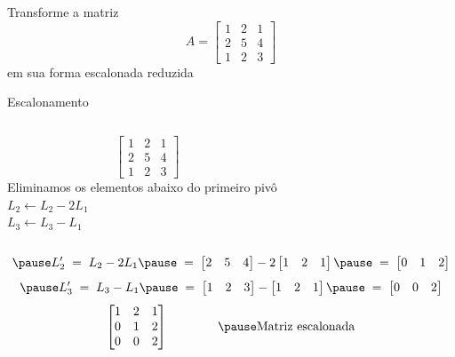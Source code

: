\begin{question}
Transforme a matriz
\[
  A =
  \begin{bmatrix}
    1 & 2 & 1 \\
    2 & 5 & 4 \\
    1 & 2 & 3
  \end{bmatrix}
\]
em sua forma escalonada reduzida
\end{question}

\begin{resolution}{Escalonamento}
\begin{columns}
  \[\;\;\;
  \begin{bmatrix}
    1 & 2 & 1 \\
    2 & 5 & 4 \\
    1 & 2 & 3
  \end{bmatrix}
  \]
  \pause
{}
  Eliminamos os elementos abaixo do primeiro pivô
  \\ \pause
  \(
    L_2 \leftarrow L_2 - 2 L_1
  \)
  \\ \pause
  \(
    L_3 \leftarrow L_3 - L_1
  \)
\end{columns}
\vspace{-\baselineskip}
\[
  \pause
  L'_2
  \;=\;
  L_2 - 2 L_1
  \pause
  \;=\;
  \begin{bmatrix}
    2 & 5 & 4
  \end{bmatrix}
  - 2
  \begin{bmatrix}
    1 & 2 & 1
  \end{bmatrix}
  \pause
  \;=\;
  \begin{bmatrix}
    0 & 1 & 2
  \end{bmatrix}
\]
\[
  \pause
  L'_3
  \;=\;
  L_3 - L_1
  \pause
  \;=\;
  \begin{bmatrix}
    1 & 2 & 3
  \end{bmatrix}
  -
  \begin{bmatrix}
    1 & 2 & 1
  \end{bmatrix}
  \pause
  \;=\;
  \begin{bmatrix}
    0 & 0 & 2
  \end{bmatrix}
\]
\pause
\[
  \begin{bmatrix}
    1 & 2 & 1 \\
    0 & 1 & 2 \\
    0 & 0 & 2
  \end{bmatrix}
  \qquad\qquad
  \pause
  \text{Matriz escalonada}
\]
\end{resolution}


